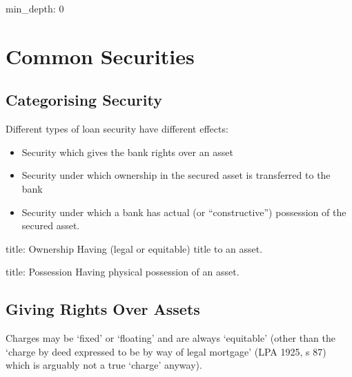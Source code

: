 \documentclass[
]{article}
\author{}
\date{}
\newenvironment{Shaded}{}{}
\newcommand{\NormalTok}[1]{#1}
\providecommand{\tightlist}{%
  \setlength{\itemsep}{0pt}\setlength{\parskip}{0pt}}
\begin{document}
{
\setcounter{tocdepth}{3}
\tableofcontents
}
\begin{Shaded}
\begin{Highlighting}[]
\NormalTok{min\_depth: 0}
\end{Highlighting}
\end{Shaded}

\hypertarget{common-securities}{%
\section{Common Securities}\label{common-securities}}

\hypertarget{categorising-security}{%
\subsection{Categorising Security}\label{categorising-security}}

Different types of loan security have different effects:

\begin{itemize}
\tightlist
\item
  Security which gives the bank rights over an asset
\item
  Security under which ownership in the secured asset is transferred to
  the bank
\item
  Security under which a bank has actual (or ``constructive'')
  possession of the secured asset.
\end{itemize}

\begin{Shaded}
\begin{Highlighting}[]
\NormalTok{title: Ownership}
\NormalTok{Having (legal or equitable) title to an asset.}
\end{Highlighting}
\end{Shaded}

\begin{Shaded}
\begin{Highlighting}[]
\NormalTok{title: Possession}
\NormalTok{Having physical possession of an asset.}
\end{Highlighting}
\end{Shaded}

\hypertarget{giving-rights-over-assets}{%
\subsection{Giving Rights Over Assets}\label{giving-rights-over-assets}}

Charges may be `fixed' or `floating' and are always `equitable' (other
than the `charge by deed expressed to be by way of legal mortgage' (LPA
1925, s 87) which is arguably not a true `charge' anyway).
\end{document}

